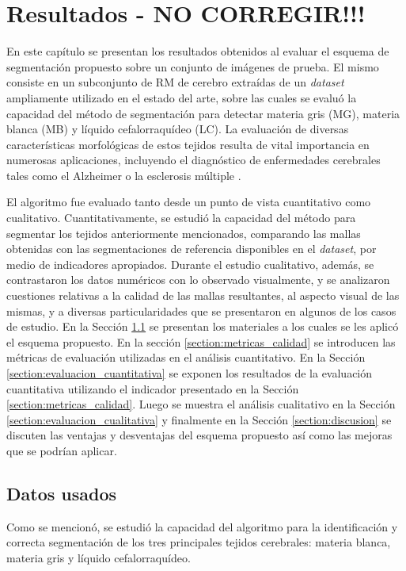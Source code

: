 \chapter{Resultados - NO CORREGIR!!!}\label{chap:resultados}
En este capítulo se presentan los resultados obtenidos al evaluar el esquema de segmentación propuesto sobre un conjunto de imágenes de prueba. El mismo consiste en un subconjunto de RM de cerebro extraídas de un \emph{dataset} ampliamente utilizado en el estado del arte, sobre las cuales se evaluó la capacidad del método de segmentación para detectar materia gris (MG), materia blanca (MB) y líquido cefalorraquídeo (LC). La evaluación de diversas características morfológicas de estos tejidos resulta de vital importancia en numerosas aplicaciones, incluyendo el diagnóstico de enfermedades cerebrales tales como el Alzheimer o la esclerosis múltiple \citep{kovacevic2002robust}.

El algoritmo fue evaluado tanto desde un punto de vista cuantitativo como cualitativo. Cuantitativamente, se estudió la capacidad del método para segmentar los tejidos anteriormente mencionados, comparando las mallas obtenidas con las segmentaciones de referencia disponibles en el \emph{dataset}, por medio de indicadores apropiados. Durante el estudio cualitativo, además, se contrastaron los datos numéricos con lo observado visualmente, y se analizaron cuestiones relativas a la calidad de las mallas resultantes, al aspecto visual de las mismas, y a diversas particularidades que se presentaron en algunos de los casos de estudio.
En la Sección \ref{section:datos_usados} se presentan los materiales a los cuales se les aplicó el esquema propuesto. En la sección \ref{section:metricas_calidad} se introducen las métricas de evaluación utilizadas en el análisis cuantitativo. En la Sección \ref{section:evaluacion_cuantitativa} se exponen los resultados de la evaluación cuantitativa utilizando el indicador presentado en la Sección \ref{section:metricas_calidad}. Luego se muestra el análisis cualitativo en la Sección \ref{section:evaluacion_cualitativa} y finalmente en la Sección \ref{section:discusion} se discuten las ventajas y desventajas del esquema propuesto así como las mejoras que se podrían aplicar.
\section{Datos usados}\label{section:datos_usados}
Como se mencionó, se estudió la capacidad del algoritmo para la identificación y correcta segmentación de los tres principales tejidos cerebrales: materia blanca, materia gris y líquido cefalorraquídeo. 


